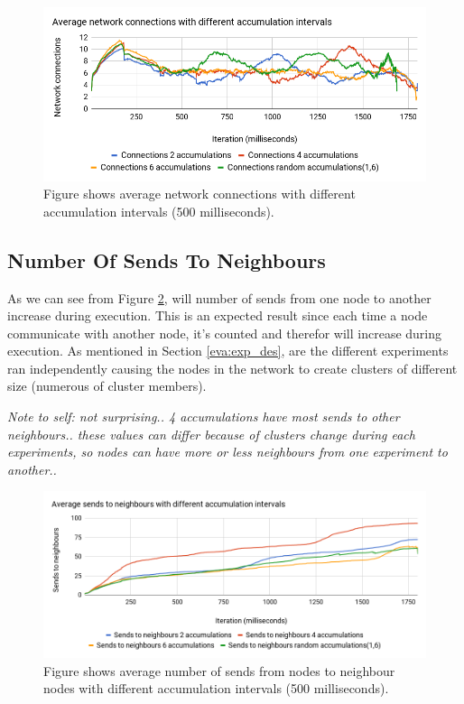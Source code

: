 \documentclass[USenglish]{uit-thesis}
\begin{document}


\begin{figure} [!b]
\centering
\includegraphics[width=\textwidth]{netconnChart.png}
\caption{Figure shows average network connections with different accumulation intervals (500 milliseconds).}
\label{fig:netconnChart}
\end{figure}


\newpage 

\subsection{Number Of Sends To Neighbours}
As we can see from Figure \ref{fig:sendsChart}, will number of sends from one node to another increase during execution. This is an expected result since each time a node communicate with another node, it's counted and therefor will increase during execution. As mentioned in Section \ref{eva:exp_des}, are the different experiments ran independently causing the nodes in the network to create clusters of different size (numerous of cluster members).

\textit{Note to self: not surprising.. 4 accumulations have most sends to other neighbours.. these values can differ because of clusters change during each experiments, so nodes can have more or less neighbours from one experiment to another..}

\begin{figure} [ht]
\centering
\includegraphics[width=\textwidth]{sendsChart.png}
\caption{Figure shows average number of sends from nodes to neighbour nodes with different accumulation intervals (500 milliseconds).}
\label{fig:sendsChart}
\end{figure}
\end{document}
